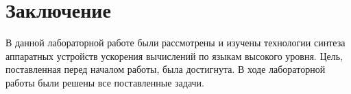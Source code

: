 \chapter*{Заключение}

В данной лабораторной работе были рассмотрены и изучены технологии синтеза аппаратных устройств ускорения вычислений по языкам высокого уровня. Цель, поставленная перед началом работы, была достигнута. В ходе лабораторной работы были решены все поставленные задачи.
